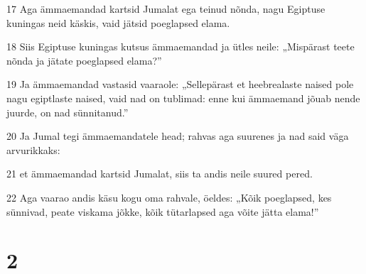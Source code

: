 \par 17 Aga ämmaemandad kartsid Jumalat ega teinud nõnda, nagu Egiptuse kuningas neid käskis, vaid jätsid poeglapsed elama.
\par 18 Siis Egiptuse kuningas kutsus ämmaemandad ja ütles neile: „Mispärast teete nõnda ja jätate poeglapsed elama?”
\par 19 Ja ämmaemandad vastasid vaaraole: „Sellepärast et heebrealaste naised pole nagu egiptlaste naised, vaid nad on tublimad: enne kui ämmaemand jõuab nende juurde, on nad sünnitanud.”
\par 20 Ja Jumal tegi ämmaemandatele head; rahvas aga suurenes ja nad said väga arvurikkaks:
\par 21 et ämmaemandad kartsid Jumalat, siis ta andis neile suured pered.
\par 22 Aga vaarao andis käsu kogu oma rahvale, öeldes: „Kõik poeglapsed, kes sünnivad, peate viskama jõkke, kõik tütarlapsed aga võite jätta elama!”

\chapter{2}

